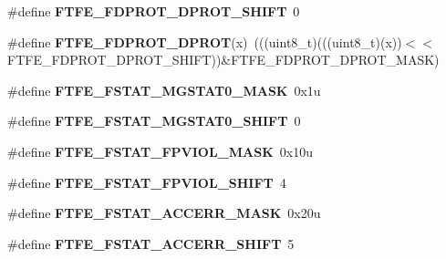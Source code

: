 \begin{DoxyCompactItemize}
\item 
\#define {\bfseries F\+T\+F\+E\+\_\+\+F\+D\+P\+R\+O\+T\+\_\+\+D\+P\+R\+O\+T\+\_\+\+S\+H\+I\+FT}~0\hypertarget{group__FTFE__Register__Masks_gaa0430b877bb9f714aa8192ac4eb3980f}{}\label{group__FTFE__Register__Masks_gaa0430b877bb9f714aa8192ac4eb3980f}

\item 
\#define {\bfseries F\+T\+F\+E\+\_\+\+F\+D\+P\+R\+O\+T\+\_\+\+D\+P\+R\+OT}(x)~(((uint8\+\_\+t)(((uint8\+\_\+t)(x))$<$$<$F\+T\+F\+E\+\_\+\+F\+D\+P\+R\+O\+T\+\_\+\+D\+P\+R\+O\+T\+\_\+\+S\+H\+I\+FT))\&F\+T\+F\+E\+\_\+\+F\+D\+P\+R\+O\+T\+\_\+\+D\+P\+R\+O\+T\+\_\+\+M\+A\+SK)\hypertarget{group__FTFE__Register__Masks_gaedb8c0b9187a153561329cd7a797a27c}{}\label{group__FTFE__Register__Masks_gaedb8c0b9187a153561329cd7a797a27c}

\item 
\#define {\bfseries F\+T\+F\+E\+\_\+\+F\+S\+T\+A\+T\+\_\+\+M\+G\+S\+T\+A\+T0\+\_\+\+M\+A\+SK}~0x1u\hypertarget{group__FTFE__Register__Masks_ga8144f9200ceb6565f82fb1a1fa7cc81f}{}\label{group__FTFE__Register__Masks_ga8144f9200ceb6565f82fb1a1fa7cc81f}

\item 
\#define {\bfseries F\+T\+F\+E\+\_\+\+F\+S\+T\+A\+T\+\_\+\+M\+G\+S\+T\+A\+T0\+\_\+\+S\+H\+I\+FT}~0\hypertarget{group__FTFE__Register__Masks_ga0b957ce5ef0e701ed13ad42b933d07c3}{}\label{group__FTFE__Register__Masks_ga0b957ce5ef0e701ed13ad42b933d07c3}

\item 
\#define {\bfseries F\+T\+F\+E\+\_\+\+F\+S\+T\+A\+T\+\_\+\+F\+P\+V\+I\+O\+L\+\_\+\+M\+A\+SK}~0x10u\hypertarget{group__FTFE__Register__Masks_ga5e42a62c072299c6b9e89000a88d14a6}{}\label{group__FTFE__Register__Masks_ga5e42a62c072299c6b9e89000a88d14a6}

\item 
\#define {\bfseries F\+T\+F\+E\+\_\+\+F\+S\+T\+A\+T\+\_\+\+F\+P\+V\+I\+O\+L\+\_\+\+S\+H\+I\+FT}~4\hypertarget{group__FTFE__Register__Masks_gad92dedd179d9ea0737c82d0e98e5d4ff}{}\label{group__FTFE__Register__Masks_gad92dedd179d9ea0737c82d0e98e5d4ff}

\item 
\#define {\bfseries F\+T\+F\+E\+\_\+\+F\+S\+T\+A\+T\+\_\+\+A\+C\+C\+E\+R\+R\+\_\+\+M\+A\+SK}~0x20u\hypertarget{group__FTFE__Register__Masks_gac4af2fee557a255ba6f2d9aa5d32aaaa}{}\label{group__FTFE__Register__Masks_gac4af2fee557a255ba6f2d9aa5d32aaaa}

\item 
\#define {\bfseries F\+T\+F\+E\+\_\+\+F\+S\+T\+A\+T\+\_\+\+A\+C\+C\+E\+R\+R\+\_\+\+S\+H\+I\+FT}~5\hypertarget{group__FTFE__Register__Masks_ga6bb97df7d14c6a986778b1d8acb765b8}{}\label{group__FTFE__Register__Masks_ga6bb97df7d14c6a986778b1d8acb765b8}


\end{DoxyCompactItemize}
